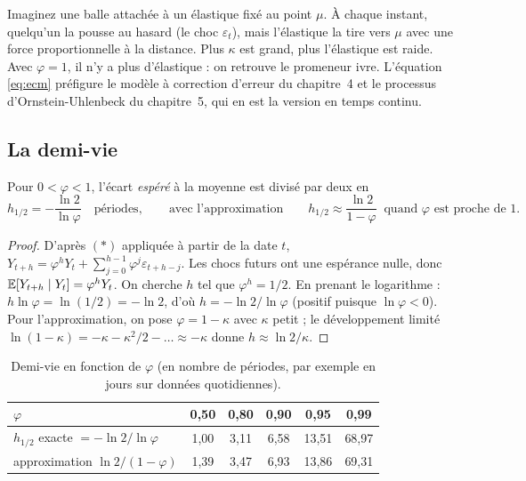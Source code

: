 \documentclass[11pt,a4paper]{article}
\begin{document}
\begin{intuition}
Imaginez une balle attachée à un élastique fixé au point $\mu$. À chaque instant, quelqu'un la pousse au hasard (le choc $\varepsilon_t$), mais l'élastique la tire vers $\mu$ avec une force proportionnelle à la distance. Plus $\kappa$ est grand, plus l'élastique est raide. Avec $\varphi = 1$, il n'y a plus d'élastique : on retrouve le promeneur ivre. L'équation \eqref{eq:ecm} préfigure le modèle à correction d'erreur du chapitre~4 et le processus d'Ornstein-Uhlenbeck du chapitre~5, qui en est la version en temps continu.
\end{intuition}

\subsection{La demi-vie}

\begin{proposition}\label{prop:hl}
Pour $0<\varphi<1$, l'écart \emph{espéré} à la moyenne est divisé par deux en
\[
h_{1/2} = -\frac{\ln 2}{\ln\varphi} \quad\text{périodes},\qquad\text{avec l'approximation}\qquad h_{1/2} \approx \frac{\ln 2}{1-\varphi}\ \text{ quand } \varphi \text{ est proche de } 1.
\]
\end{proposition}
\begin{proof}
D'après $(\ast)$ appliquée à partir de la date $t$, $Y_{t+h} = \varphi^hY_t + \sum_{j=0}^{h-1}\varphi^j\varepsilon_{t+h-j}$. Les chocs futurs ont une espérance nulle, donc $\mathbb{E}[Y_{t+h}\mid Y_t] = \varphi^h Y_t$. On cherche $h$ tel que $\varphi^h = 1/2$. En prenant le logarithme : $h\ln\varphi = \ln(1/2) = -\ln 2$, d'où $h = -\ln 2/\ln\varphi$ (positif puisque $\ln\varphi<0$). Pour l'approximation, on pose $\varphi = 1-\kappa$ avec $\kappa$ petit ; le développement limité $\ln(1-\kappa) = -\kappa - \kappa^2/2 - \dots \approx -\kappa$ donne $h \approx \ln 2/\kappa$.
\end{proof}

\begin{table}[h]
\centering\small
\caption{Demi-vie en fonction de $\varphi$ (en nombre de périodes, par exemple en jours sur données quotidiennes).}
\label{tab:hl}
\begin{tabular}{lccccc}
\toprule
$\varphi$ & 0,50 & 0,80 & 0,90 & 0,95 & 0,99 \\
\midrule
$h_{1/2}$ exacte $= -\ln2/\ln\varphi$ & 1,00 & 3,11 & 6,58 & 13,51 & 68,97 \\
approximation $\ln 2/(1-\varphi)$ & 1,39 & 3,47 & 6,93 & 13,86 & 69,31 \\
\bottomrule
\end{tabular}
\end{table}
\end{document}
